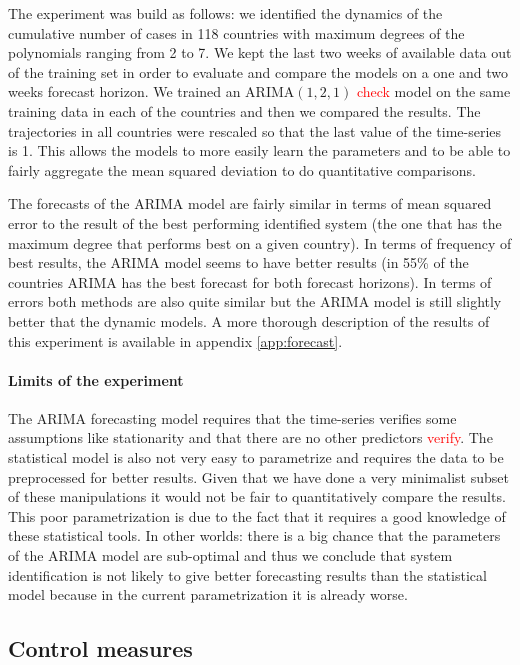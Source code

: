 \documentclass[12pt, letterpaper]{article}
\newcommand{\com}[1]{{\small {\fontfamily{ptm} \selectfont \textcolor{red}{#1}}}}
\begin{document}
The experiment was build as follows: we identified the dynamics of the cumulative number of cases in 118 countries with maximum degrees of the polynomials ranging from 2 to 7. 
We kept the last two weeks of available data out of the training set in order to evaluate and compare the models on a one and two weeks forecast horizon.
We trained an ARIMA$(1, 2, 1)$ \com{check} model on the same training data in each of the countries and then we compared the results. 
The trajectories in all countries were rescaled so that the last value of the time-series is 1. 
This allows the models to more easily learn the parameters and to be able to fairly aggregate the mean squared deviation to do quantitative comparisons.

The forecasts of the ARIMA model are fairly similar in terms of mean squared error to the result of the best performing identified system (the one that has the maximum degree that performs best on a given country). 
In terms of frequency of best results, the ARIMA model seems to have better results (in 55\% of the countries ARIMA has the best forecast for both forecast horizons). 
In terms of errors both methods are also quite similar but the ARIMA model is still slightly better that the dynamic models. A more thorough description of the results of this experiment is available in appendix \ref{app:forecast}.

\paragraph{Limits of the experiment}

The ARIMA forecasting model requires that the time-series verifies some assumptions like stationarity and that there are no other predictors \com{verify}. 
The statistical model is also not very easy to parametrize and requires the data to be preprocessed for better results.
Given that we have done a very minimalist subset of these manipulations it would not be fair to quantitatively compare the results.
This poor parametrization is due to the fact that it requires a good knowledge of these statistical tools.
In other worlds: there is a big chance that the parameters of the ARIMA model are sub-optimal and thus we conclude that system identification is not likely to give better forecasting results than the statistical model because in the current parametrization it is already worse.

\subsection{Control measures}
\end{document}
